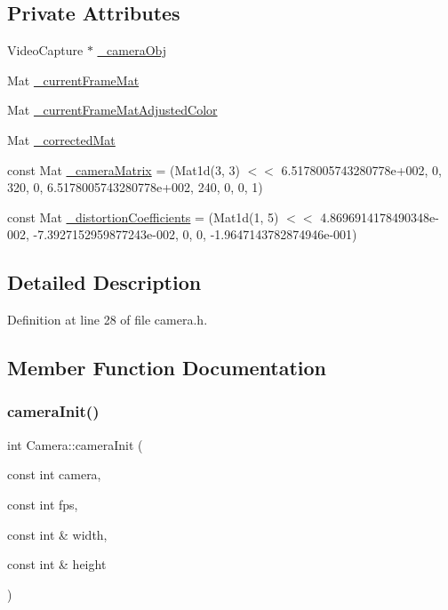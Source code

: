 \subsection*{Private Attributes}
\begin{DoxyCompactItemize}
\item 
Video\+Capture $\ast$ \mbox{\hyperlink{class_camera_a4b052388a85d60aaca71726e1d8dbea9}{\+\_\+camera\+Obj}}
\item 
Mat \mbox{\hyperlink{class_camera_af0a36cb5108ca656eccd85c58508ae5f}{\+\_\+current\+Frame\+Mat}}
\item 
Mat \mbox{\hyperlink{class_camera_aeeeed5ac66a515e73cb315df765834ef}{\+\_\+current\+Frame\+Mat\+Adjusted\+Color}}
\item 
Mat \mbox{\hyperlink{class_camera_aadacf0c0381546be20b9c707f8e88a42}{\+\_\+corrected\+Mat}}
\item 
const Mat \mbox{\hyperlink{class_camera_a1e024292a6e5481b8719ec16c34121e6}{\+\_\+camera\+Matrix}} = (Mat1d(3, 3) $<$$<$ 6.\+5178005743280778e+002, 0, 320, 0, 6.\+5178005743280778e+002, 240, 0, 0, 1)
\item 
const Mat \mbox{\hyperlink{class_camera_a1e62bd10af4149eab0ca79e1c39a11ea}{\+\_\+distortion\+Coefficients}} = (Mat1d(1, 5) $<$$<$ 4.\+8696914178490348e-\/002, -\/7.\+3927152959877243e-\/002, 0, 0, -\/1.\+9647143782874946e-\/001)
\end{DoxyCompactItemize}


\subsection{Detailed Description}


Definition at line 28 of file camera.\+h.



\subsection{Member Function Documentation}
\mbox{\label{class_camera_a6d17b81a1e987db60f5144d922f54e9d}} 
\subsubsection{\texorpdfstring{cameraInit()}{cameraInit()}}
{\footnotesize\ttfamily int Camera\+::camera\+Init (\begin{DoxyParamCaption}\item[{const int}]{camera,  }\item[{const int}]{fps,  }\item[{const int \&}]{width,  }\item[{const int \&}]{height }\end{DoxyParamCaption})}



